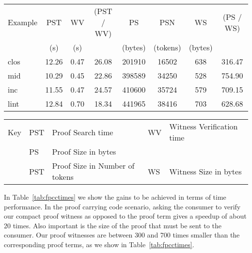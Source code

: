 \documentclass{llncs}
\begin{document}
\begin{table*}[htbp]
\begin{center}
\begin{small}
\begin{tabular}{|l|c|c|c|c|c|c|c|}
\hline
Example & PST & WV & (PST / WV) & PS & PSN & WS & (PS / WS)\\
& (s) & (s) & & (bytes) & (tokens) & (bytes) &\\
\hline
clos & 12.26 & 0.47 & 26.08& 201910 & 16502 & 638 & 316.47\\
mid & 10.29 & 0.45 & 22.86& 398589 & 34250 & 528 & 754.90\\
inc & 11.55 & 0.47 & 24.57& 410600 & 35724 & 579 & 709.15\\
lint & 12.84 & 0.70 & 18.34& 441965 & 38416 & 703 & 628.68\\
\hline
\end{tabular}
\begin{tabular}{ll@{=}ll@{=}l}
Key & PST & Proof Search time
&WV & Witness Verification time\\ 
&PS & Proof Size in bytes\\
&PST & Proof Size in Number of tokens 
&WS & Witness Size in bytes\\
\end{tabular} 
\end{small}
\end{center}
\caption{\label{tab:fpcctimes}
FPCC: Times without Caching}
\end{table*}

In Table~\ref{tab:fpcctimes} we show the gains to be achieved in terms of
time performance. In the proof carrying code scenario, asking the consumer
to verify our compact proof witness as opposed to the proof term gives a 
speedup of about 20 times. Also important is the size of the proof that
must be sent to the consumer. Our proof witnesses are between 300 and 700
times smaller than the corresponding proof terms, as we show in
Table~\ref{tab:fpcctimes}.

\end{document}
